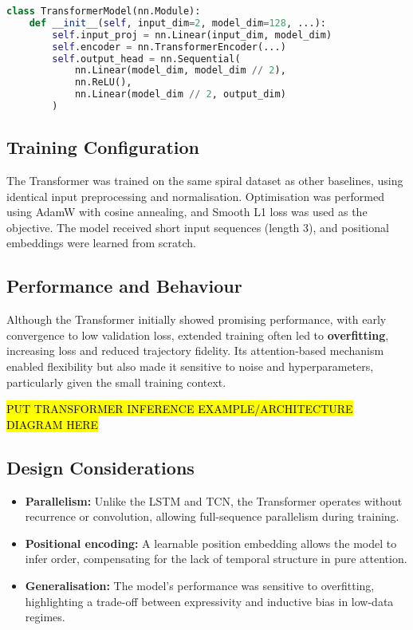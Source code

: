 \begin{lstlisting}[language=Python, caption={Simplified Transformer architecture}]
class TransformerModel(nn.Module):
    def __init__(self, input_dim=2, model_dim=128, ...):
        self.input_proj = nn.Linear(input_dim, model_dim)
        self.encoder = nn.TransformerEncoder(...)
        self.output_head = nn.Sequential(
            nn.Linear(model_dim, model_dim // 2),
            nn.ReLU(),
            nn.Linear(model_dim // 2, output_dim)
        )
\end{lstlisting}

\subsection{Training Configuration}
The Transformer was trained on the same spiral dataset as other baselines, using identical input preprocessing and normalisation. Optimisation was performed using AdamW with cosine annealing, and Smooth L1 loss was used as the objective. The model received short input sequences (length 3), and positional embeddings were learned from scratch.

\subsection{Performance and Behaviour}
Although the Transformer initially showed promising performance, with early convergence to low validation loss, extended training often led to \textbf{overfitting}, increasing loss and reduced trajectory fidelity. Its attention-based mechanism enabled flexibility but also made it sensitive to noise and hyperparameters, particularly given the small training context.

\hl{PUT TRANSFORMER INFERENCE EXAMPLE/ARCHITECTURE DIAGRAM HERE}


\subsection{Design Considerations}
\begin{itemize}
    \item \textbf{Parallelism:} Unlike the LSTM and TCN, the Transformer operates without recurrence or convolution, allowing full-sequence parallelism during training.
    \item \textbf{Positional encoding:} A learnable position embedding allows the model to infer order, compensating for the lack of temporal structure in pure attention.
    \item \textbf{Generalisation:} The model's performance was sensitive to overfitting, highlighting a trade-off between expressivity and inductive bias in low-data regimes.
\end{itemize}


